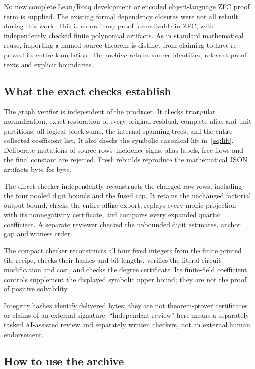 \documentclass[11pt,letterpaper]{article}
\theoremstyle{definition}\newtheorem{definition}[theorem]{Definition}
\theoremstyle{remark}\newtheorem{remark}[theorem]{Remark}
\begin{document}
No new complete Lean/Rocq development or encoded object-language ZFC proof
term is supplied. The existing formal dependency closures were not all
rebuilt during this work. This is an ordinary proof formalizable in ZFC,
with independently checked finite polynomial artifacts. As in standard
mathematical reuse, importing a named source theorem is distinct from
claiming to have re-proved its entire foundation. The archive retains
source identities, relevant proof texts and explicit boundaries.

\subsection{What the exact checks establish}

The graph verifier is independent of the producer. It checks triangular
normalization, exact restoration of every original residual, complete
alias and unit partitions, all logical block sums, the internal spanning
trees, and the entire collected coefficient list. It also checks the
symbolic canonical lift in~\eqref{eq:lift}. Deliberate mutations of source
rows, incidence signs, alias labels, free flows and the final constant
are rejected. Fresh rebuilds reproduce the mathematical JSON artifacts
byte for byte.

The direct checker independently reconstructs the changed raw rows,
including the four pooled digit bounds and the fused cap. It retains
the unchanged factorial output bound, checks the entire affine export,
replays every monic projection with its nonnegativity certificate, and
compares every expanded quartic coefficient. A separate reviewer checked
the unbounded digit estimates, anchor gap and witness order.

The compact checker reconstructs all four fixed integers from the finite
printed tile recipe, checks their hashes and bit lengths, verifies the
literal circuit modification and cost, and checks the degree certificate.
Its finite-field coefficient controls supplement the displayed symbolic
upper bound; they are not the proof of positive solvability.

Integrity hashes identify delivered bytes; they are not theorem-prover
certificates or claims of an external signature. ``Independent review''
here means a separately tasked AI-assisted review and separately written
checkers, not an external human endorsement.

\subsection{How to use the archive}
\end{document}
